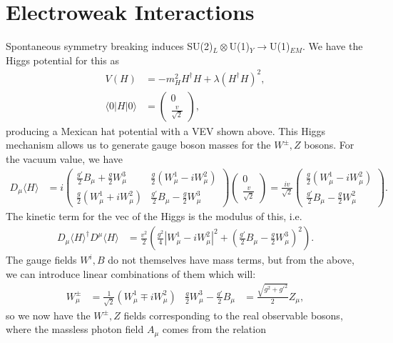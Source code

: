 \documentclass[relqm.tex]{subfiles}
\begin{document}
\chapter{Electroweak Interactions}
Spontaneous symmetry breaking induces SU(2)$_L\otimes$U(1)$_Y\to$U(1)$_{EM}$.
We have the Higgs potential for this as
\begin{align}
    V(H) &= -m_H^2H^\dagger H + \lambda(H^\dagger H)^2, \\
    \langle0|H|0\rangle &= \begin{pmatrix} 0 \\ \frac{v}{\sqrt{2}}\end{pmatrix},
\end{align}
producing a Mexican hat potential with a VEV shown above. 
This Higgs mechanism allows us to generate gauge boson masses for the $W^\pm,Z$ bosons. 
For the vacuum value, we have
\begin{align}
    D_\mu\langle H\rangle &= i\begin{pmatrix} \frac{g'}{2}B_\mu + \frac{g}{2}W_\mu^3 & \frac{g}{2}\left(W^1_\mu - iW_\mu^2\right) \\ \frac{g}{2}\left(W_\mu^1+iW_\mu^2\right) & \frac{g'}{2}B_\mu - \frac{g}{2}W_\mu^3\end{pmatrix} \begin{pmatrix} 0 \\ \frac{v}{\sqrt{2}} \end{pmatrix} = \frac{iv}{\sqrt{2}}\begin{pmatrix} \frac{g}{2}(W_\mu^1-iW_\mu^2) \\ \frac{g'}{2}B_\mu - \frac{g}{2}W_\mu^2\end{pmatrix}.
\end{align}
The kinetic term for the vec of the Higgs is the modulus of this, i.e.
\begin{align}
    D_\mu\langle H\rangle^\dagger D^\mu\langle H\rangle &= \frac{v^2}{2}\left(\frac{g^2}{4}|W_\mu^1-iW_\mu^2|^2 + \left(\frac{g'}{2}B_\mu - \frac{g}{2}W_\mu^3\right)^2\right).
\end{align}
The gauge fields $W^i,B$ do not themselves have mass terms, but from the above, we can introduce linear combinations of them which will:
\begin{align}
    W_\mu^\pm &= \frac{1}{\sqrt{2}}\left(W_\mu^1\mp iW_\mu^2\right) & \frac{g}{2}W_\mu^3 - \frac{g'}{2}B_\mu &= \frac{\sqrt{g^2+g'^2}}{2}Z_\mu,
\end{align}
so we now have the $W^\pm,Z$ fields corresponding to the real observable bosons, where the massless photon field $A_\mu$ comes from the relation
\end{document}
